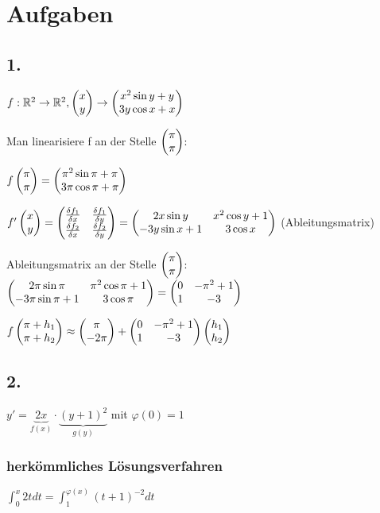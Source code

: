 \renewcommand{\ldate}{2016-01-08}

\section{Aufgaben}

\subsection{1.}
$f: \mathbb{R}^2 \rightarrow \mathbb{R}^2,  \begin{pmatrix} x\\y \end{pmatrix}  \rightarrow  \begin{pmatrix} x^2 \sin y + y\\3y\cos x + x \end{pmatrix} $

Man linearisiere f an der Stelle $ \begin{pmatrix} \pi\\\pi \end{pmatrix} $:

$ f \begin{pmatrix} \pi\\\pi \end{pmatrix}  =  \begin{pmatrix} \pi^2 \sin \pi + \pi\\3\pi\cos \pi + \pi \end{pmatrix}  $

$ f' \begin{pmatrix} x\\y \end{pmatrix}  =  \begin{pmatrix} \frac{\delta f_1}{\delta x} & \frac{\delta f_1}{\delta y}\\\frac{\delta f_2}{\delta x} & \frac{\delta f_2}{\delta y} \end{pmatrix}  
=  \begin{pmatrix} 2x\sin y & x^2\cos y + 1\\ - 3 y \sin x + 1 & 3 \cos x \end{pmatrix} $ (Ableitungsmatrix)

Ableitungsmatrix an der Stelle $ \begin{pmatrix} \pi\\\pi \end{pmatrix} $:
$  \begin{pmatrix} 2\pi\sin \pi & \pi^2\cos \pi + 1\\ - 3 \pi \sin \pi + 1 & 3 \cos \pi \end{pmatrix}  
=  \begin{pmatrix} 0 & -\pi^2 + 1\\1 & -3 \end{pmatrix} $

$ f \begin{pmatrix} \pi + h_1\\\pi + h_2 \end{pmatrix}  \approx  \begin{pmatrix} \pi\\-2\pi \end{pmatrix}  +  \begin{pmatrix} 0 & -\pi^2 + 1\\1 & -3 \end{pmatrix}   \begin{pmatrix} h_1\\h_2 \end{pmatrix}  $

\subsection{2.}
$ y' = \underbrace{2x}_{f(x)} \cdot \underbrace{(y+1)^2}_{g(y)}$ mit $\varphi(0) = 1$

\subsubsection{herkömmliches Lösungsverfahren}
$ \int_{0}^{x} 2t dt = \int_{1}^{\varphi(x)} (t+1)^{-2} dt $ 

